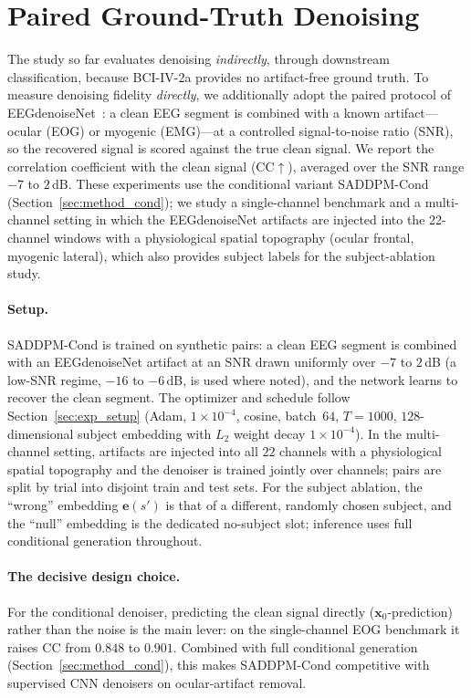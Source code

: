\section{Paired Ground-Truth Denoising}
\label{sec:exp_phase2}

The study so far evaluates denoising \emph{indirectly}, through downstream
classification, because BCI-IV-2a provides no artifact-free ground truth. To
measure denoising fidelity \emph{directly}, we additionally adopt the paired
protocol of EEGdenoiseNet~\cite{zhang2021eegdenoisenet}: a clean EEG segment is
combined with a known artifact---ocular (EOG) or myogenic (EMG)---at a controlled
signal-to-noise ratio (SNR), so the recovered signal is scored against the true
clean signal. We report the correlation coefficient with the clean signal
(CC$\uparrow$), averaged over the SNR range $-7$ to $2$\,dB. These experiments use
the conditional variant \mbox{SADDPM-Cond} (Section~\ref{sec:method_cond}); we study a
single-channel benchmark and a multi-channel setting in which the EEGdenoiseNet
artifacts are injected into the 22-channel windows with a physiological spatial
topography (ocular frontal, myogenic lateral), which also provides subject labels
for the subject-ablation study.

\paragraph{Setup.} \mbox{SADDPM-Cond} is trained on synthetic pairs: a clean EEG
segment is combined with an EEGdenoiseNet artifact at an SNR drawn uniformly over
$-7$ to $2$\,dB (a low-SNR regime, $-16$ to $-6$\,dB, is used where noted), and the
network learns to recover the clean segment. The optimizer and schedule follow
Section~\ref{sec:exp_setup} (Adam, $1\times10^{-4}$, cosine, batch~$64$, $T=1000$,
$128$-dimensional subject embedding with $L_2$ weight decay $1\times10^{-4}$). In
the multi-channel setting, artifacts are injected into all $22$ channels with a
physiological spatial topography and the denoiser is trained jointly over
channels; pairs are split by trial into disjoint train and test sets. For the
subject ablation, the ``wrong'' embedding $\mathbf{e}(s')$ is that of a different,
randomly chosen subject, and the ``null'' embedding is the dedicated no-subject
slot; inference uses full conditional generation throughout.

\paragraph{The decisive design choice.} For the conditional denoiser, predicting
the clean signal directly ($\mathbf{x}_0$-prediction) rather than the noise is the
main lever: on the single-channel EOG benchmark it raises CC from $0.848$ to
$0.901$. Combined with full conditional generation
(Section~\ref{sec:method_cond}), this makes \mbox{SADDPM-Cond} competitive with
supervised CNN denoisers on ocular-artifact removal.

